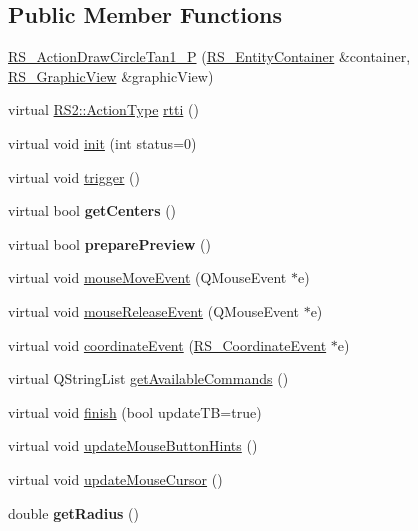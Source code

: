 \subsection*{Public Member Functions}
\begin{DoxyCompactItemize}
\item 
\hyperlink{classRS__ActionDrawCircleTan1__2P_ac5b7b1849141bf862b4c35909033feba}{R\-S\-\_\-\-Action\-Draw\-Circle\-Tan1\-\_\-P} (\hyperlink{classRS__EntityContainer}{R\-S\-\_\-\-Entity\-Container} \&container, \hyperlink{classRS__GraphicView}{R\-S\-\_\-\-Graphic\-View} \&graphic\-View)
\item 
virtual \hyperlink{classRS2_afe3523e0bc41fd637b892321cfc4b9d7}{R\-S2\-::\-Action\-Type} \hyperlink{classRS__ActionDrawCircleTan1__2P_a67e77b353ae96930a41be9af0b145053}{rtti} ()
\item 
virtual void \hyperlink{classRS__ActionDrawCircleTan1__2P_a694a5a5f6803b49a85b21c8dd33cf56d}{init} (int status=0)
\item 
virtual void \hyperlink{classRS__ActionDrawCircleTan1__2P_af85c0aaecb1c0405e7991bdcb044b967}{trigger} ()
\item 
\hypertarget{classRS__ActionDrawCircleTan1__2P_a89cb4bba99b33c82ffeb664e7446358d}{virtual bool {\bfseries get\-Centers} ()}\label{classRS__ActionDrawCircleTan1__2P_a89cb4bba99b33c82ffeb664e7446358d}

\item 
\hypertarget{classRS__ActionDrawCircleTan1__2P_adcbba395d5eec41b1c3be8567fe1bb2a}{virtual bool {\bfseries prepare\-Preview} ()}\label{classRS__ActionDrawCircleTan1__2P_adcbba395d5eec41b1c3be8567fe1bb2a}

\item 
virtual void \hyperlink{classRS__ActionDrawCircleTan1__2P_a1e5e06da2b702b85bebf910bffd3cc75}{mouse\-Move\-Event} (Q\-Mouse\-Event $\ast$e)
\item 
virtual void \hyperlink{classRS__ActionDrawCircleTan1__2P_a2c2cf31a5c3026ce8a956966dfef6913}{mouse\-Release\-Event} (Q\-Mouse\-Event $\ast$e)
\item 
virtual void \hyperlink{classRS__ActionDrawCircleTan1__2P_a3c389cf2e5e5708d44bca6fc8526160a}{coordinate\-Event} (\hyperlink{classRS__CoordinateEvent}{R\-S\-\_\-\-Coordinate\-Event} $\ast$e)
\item 
virtual Q\-String\-List \hyperlink{classRS__ActionDrawCircleTan1__2P_aa38679944da8e5aa5ea2073fca1002cf}{get\-Available\-Commands} ()
\item 
virtual void \hyperlink{classRS__ActionDrawCircleTan1__2P_a2a4f22a1e5b149dd8a7d029a1535fd40}{finish} (bool update\-T\-B=true)
\item 
virtual void \hyperlink{classRS__ActionDrawCircleTan1__2P_acdbe11711caccb83686efd13dd842798}{update\-Mouse\-Button\-Hints} ()
\item 
virtual void \hyperlink{classRS__ActionDrawCircleTan1__2P_a972b009d07dc5898d26edc0487488bc8}{update\-Mouse\-Cursor} ()
\item 
\hypertarget{classRS__ActionDrawCircleTan1__2P_a31fccc718357eaa582df02af7f05ff4a}{double {\bfseries get\-Radius} ()}\label{classRS__ActionDrawCircleTan1__2P_a31fccc718357eaa582df02af7f05ff4a}

\end{DoxyCompactItemize}
